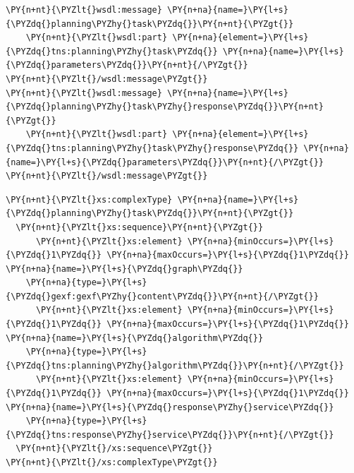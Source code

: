 \begin{program}
\begin{code}
\begin{Verbatim}[commandchars=\\\{\}]
\PY{n+nt}{\PYZlt{}wsdl:message} \PY{n+na}{name=}\PY{l+s}{\PYZdq{}planning\PYZhy{}task\PYZdq{}}\PY{n+nt}{\PYZgt{}}
    \PY{n+nt}{\PYZlt{}wsdl:part} \PY{n+na}{element=}\PY{l+s}{\PYZdq{}tns:planning\PYZhy{}task\PYZdq{}} \PY{n+na}{name=}\PY{l+s}{\PYZdq{}parameters\PYZdq{}}\PY{n+nt}{/\PYZgt{}}
\PY{n+nt}{\PYZlt{}/wsdl:message\PYZgt{}}
\PY{n+nt}{\PYZlt{}wsdl:message} \PY{n+na}{name=}\PY{l+s}{\PYZdq{}planning\PYZhy{}task\PYZhy{}response\PYZdq{}}\PY{n+nt}{\PYZgt{}}
    \PY{n+nt}{\PYZlt{}wsdl:part} \PY{n+na}{element=}\PY{l+s}{\PYZdq{}tns:planning\PYZhy{}task\PYZhy{}response\PYZdq{}} \PY{n+na}{name=}\PY{l+s}{\PYZdq{}parameters\PYZdq{}}\PY{n+nt}{/\PYZgt{}}
\PY{n+nt}{\PYZlt{}/wsdl:message\PYZgt{}}
\end{Verbatim}
\end{code}
\end{program}

\begin{program}
\begin{code}
\begin{Verbatim}[commandchars=\\\{\}]
\PY{n+nt}{\PYZlt{}xs:complexType} \PY{n+na}{name=}\PY{l+s}{\PYZdq{}planning\PYZhy{}task\PYZdq{}}\PY{n+nt}{\PYZgt{}}
  \PY{n+nt}{\PYZlt{}xs:sequence}\PY{n+nt}{\PYZgt{}}
      \PY{n+nt}{\PYZlt{}xs:element} \PY{n+na}{minOccurs=}\PY{l+s}{\PYZdq{}1\PYZdq{}} \PY{n+na}{maxOccurs=}\PY{l+s}{\PYZdq{}1\PYZdq{}} \PY{n+na}{name=}\PY{l+s}{\PYZdq{}graph\PYZdq{}} 
	\PY{n+na}{type=}\PY{l+s}{\PYZdq{}gexf:gexf\PYZhy{}content\PYZdq{}}\PY{n+nt}{/\PYZgt{}}
      \PY{n+nt}{\PYZlt{}xs:element} \PY{n+na}{minOccurs=}\PY{l+s}{\PYZdq{}1\PYZdq{}} \PY{n+na}{maxOccurs=}\PY{l+s}{\PYZdq{}1\PYZdq{}} \PY{n+na}{name=}\PY{l+s}{\PYZdq{}algorithm\PYZdq{}} 
	\PY{n+na}{type=}\PY{l+s}{\PYZdq{}tns:planning\PYZhy{}algorithm\PYZdq{}}\PY{n+nt}{/\PYZgt{}}
      \PY{n+nt}{\PYZlt{}xs:element} \PY{n+na}{minOccurs=}\PY{l+s}{\PYZdq{}1\PYZdq{}} \PY{n+na}{maxOccurs=}\PY{l+s}{\PYZdq{}1\PYZdq{}} \PY{n+na}{name=}\PY{l+s}{\PYZdq{}response\PYZhy{}service\PYZdq{}} 
	\PY{n+na}{type=}\PY{l+s}{\PYZdq{}tns:response\PYZhy{}service\PYZdq{}}\PY{n+nt}{/\PYZgt{}}
  \PY{n+nt}{\PYZlt{}/xs:sequence\PYZgt{}}
\PY{n+nt}{\PYZlt{}/xs:complexType\PYZgt{}}
\end{Verbatim}
\end{code}
\end{program}

